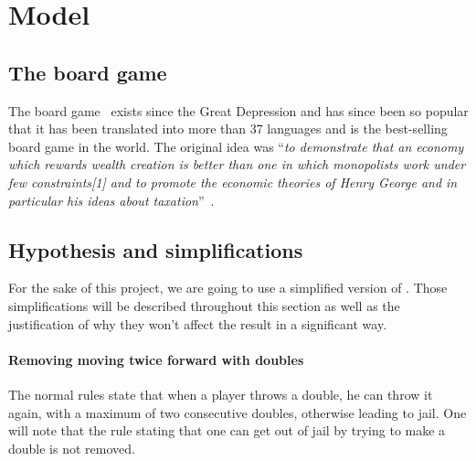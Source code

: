 \section{Model} %
\label{sec:model}

\subsection{The board game} %
\label{sub:the_board_game}
The board game \monopoly~exists since the Great Depression and has
since been so popular that it has been translated into more than 37
languages and is the best-selling board game in the world.
The original idea was \enquote{\textit{to demonstrate that an economy which
rewards wealth creation is better than one in which monopolists work
under few constraints[1] and to promote the economic theories of Henry
George and in particular his ideas about taxation}}~\cite{wiki:monopoly}.



\subsection{Hypothesis and simplifications} %
\label{sub:hypothesis_and_simplifications}
For the sake of this project, we are going to use a simplified
version of \monopoly. Those simplifications will be described throughout
this section as well as the justification of why they won't affect
the result in a significant way.

\paragraph{Removing moving twice forward with doubles} %
\label{par:removing_special_rules_with_doubles}
The normal rules state that when a player throws a double, he can throw
it again, with a maximum of two consecutive doubles, otherwise leading
to jail.
One will note that the rule stating that one can get out of jail
by trying to make a double is not removed.

